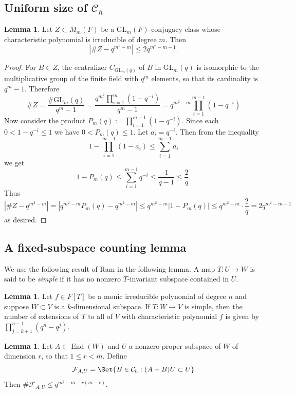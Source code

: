 \documentclass[preprint,11pt]{amsart}
\newcommand{\CalC}{\mathcal{C}}
\newcommand{\CalF}{\mathcal{F}}
\theoremstyle{definition}
\numberwithin{thm}{section}
\newtheorem{lem}[thm]{Lemma}
\newcommand{\End}{\operatorname{End}}
\newcommand{\abs}[1]{\left| #1 \right|}
\newcommand{\tit}[1]{\textit{#1}}
\newcommand{\GL}{\textrm{GL}}
\newcommand{\sub}{\subset}
\begin{document}
\subsection{Uniform size of $\CalC_h$}

\begin{lem}\label{m_conj_count}
Let $Z \subset M_m(F)$ be a $\GL_m(F)$-conjugacy class whose characteristic polynomial is irreducible of degree $m$. Then
$$
\abs{\#Z - q^{m^2 - m}} \leq 2 q^{m^2 - m -1}.
$$
\end{lem}
\begin{proof}
For $B \in Z$, the centralizer $C_{\GL_m(q)}$ of $B$ in $\GL_m(q)$ is isomorphic to the multiplicative group of the finite field with $q^m$ elements, so that its cardinality is $q^m-1$. Therefore 
$$
\#Z = \frac{\# \GL_m(q)}{q^m-1}= \frac{q^{m^2} \prod_{i = 1}^m (1- q^{-i})}{q^m-1} = q^{m^2 - m} \prod_{i =1}^{m-1} (1 - q^{-i})
$$
Now consider the product $P_m(q) := \prod_{i = 1}^{m-1} (1 - q^{-i})$. Since each $0 < 1- q^{-i} \leq 1$ we have $0 < P_m(q) \leq 1$. Let $a_i = q^{-i}$. Then from the inequality 
$$
1  - \prod_{i = 1}^{m-1} (1 - a_i) \leq \sum_{i = 1}^{m-1} a_i
$$
we get
$$
1- P_m(q) \leq \sum_{i = 1}^{m-1} q^{-i} \leq \frac{1}{q-1} \leq \frac{2}{q}.
$$
Thus 
$$\abs{\#Z - q^{m^2 - m}} = \abs{q^{m^2 -m}  P_m(q) - q^{m^2 - m} } \leq q^{m^2 -m} \abs{ 1 - P_m(q)} \leq q^{m^2-m} \cdot \frac{2}{q} = 2 q^{m^2-m-1}
$$
as desired.
\end{proof}


\subsection{A fixed-subspace counting lemma}


We use the following result of Ram \cite[Lemma $2.7$]{Ra} in the following lemma. A map $T : U \to W$ is said to be \tit{simple} if it has no nonzero $T$-invariant subspace contained in $U$. 
\begin{lem}\label{ram}
Let $f \in F[T]$ be a monic irreducible polynomial of degree $n$ and suppose $W \sub V$ is a $k$-dimensional subspace. If $T : W \to V$ is simple, then the number of extensions of $T$ to all of $V$ with characteristic polynomial $f$ is given by $\prod_{j = k+1}^{n-1} (q^n -q^j). $
\end{lem}

\begin{lem}
Let $A \in \End(W)$ and $U$ a nonzero proper subspace of $W$ of dimension $r$, so that $1 \leq r < m$. Define
$$
\CalF_{A,U} = \Set{ B \in \CalC_h : (A-B)U \sub U}
$$
Then $\# \CalF_{A,U} \leq q^{m^2-m-r(m-r)}$.
\end{lem}
\end{document}
